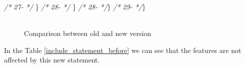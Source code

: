 \documentclass[
]{article}
\newenvironment{Shaded}{\begin{snugshade}}{\end{snugshade}}
\newcommand{\CommentTok}[1]{\textcolor[rgb]{0.56,0.35,0.01}{\textit{#1}}}
\newcommand{\NormalTok}[1]{#1}
\begin{document}
\begin{landscape}
\begin{Shaded}
\begin{Highlighting}[]
\CommentTok{/* 27-                 */}\NormalTok{     \}                                                         }\CommentTok{/* 28-                 */}\NormalTok{     \}                                                         }
\CommentTok{/* 28-                 */}\NormalTok{\}                                                              }\CommentTok{/* 29-                 */}\NormalTok{\}                                                              }
\end{Highlighting}
\end{Shaded}

\normalsize

\begin{figure}
\centering
\includegraphics{figures/fake.png}
\caption{Comparison between old and new version
\label{comparison_include_statement_before}}
\end{figure}

\end{landscape}

\newpage

In the Table \ref{include_statement_before} we can see that the features
are not affected by this new statement.

\small
\end{document}
